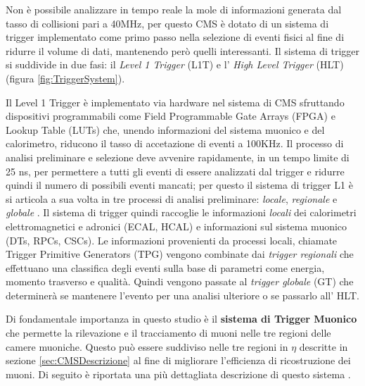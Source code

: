 Non è possibile analizzare in tempo reale la mole di informazioni generata dal tasso di collisioni pari a 40MHz, per questo CMS è dotato di un sistema di trigger implementato come primo passo nella selezione di eventi fisici al fine di ridurre il volume di dati, mantenendo però quelli interessanti. Il sistema di trigger si suddivide in due fasi: il \textit{Level 1 Trigger} (L1T) e l' \textit{High Level Trigger} (HLT) (figura \ref{fig:TriggerSystem}). 

Il Level 1 Trigger è implementato via hardware nel sistema di CMS sfruttando dispositivi programmabili come Field Programmable Gate Arrays (FPGA) e Lookup Table (LUTs) che, unendo informazioni del sistema muonico e del calorimetro, riducono il tasso di accetazione di eventi a 100KHz. Il processo di analisi preliminare e selezione deve avvenire rapidamente, in un tempo limite di 25 ns, per permettere a tutti gli eventi di essere analizzati dal trigger e ridurre quindi il numero di possibili eventi mancati; per questo il sistema di trigger L1 è si articola a sua volta in tre processi di analisi preliminare: \textit{locale}, \textit{regionale} e \textit{globale} \cite{MasterThesisNicLai}.
Il sistema di trigger quindi raccoglie le informazioni \textit{locali} dei calorimetri elettromagnetici e adronici (ECAL, HCAL) e informazioni sul sistema muonico (DTs, RPCs, CSCs). Le informazioni provenienti da processi locali, chiamate Trigger Primitive Generators (TPG) vengono combinate dai \textit{trigger regionali} che effettuano una classifica degli eventi sulla base di parametri come energia, momento trasverso e qualità. Quindi vengono passate al \textit{trigger globale} (GT) che determinerà se mantenere l'evento per una analisi ulteriore o se passarlo all' HLT.


Di fondamentale importanza in questo studio è il \textbf{sistema di Trigger Muonico} che permette la rilevazione e il tracciamento di muoni nelle tre regioni delle camere muoniche. Questo può essere suddiviso nelle tre regioni in $\eta$ descritte in sezione \ref{sec:CMSDescrizione} al fine di migliorare l'efficienza di ricostruzione dei muoni. Di seguito è riportata una più dettagliata descrizione di questo sistema \cite{sirunyan2020performance}.


